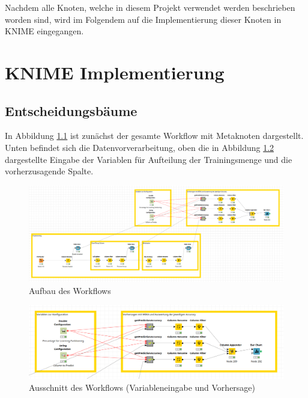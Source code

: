 \documentclass[12pt,					%
							 oneside,			%
							 a4paper,			%
							 halfparskip,		%
							 liststotoc,			%
							 bibtotoc,			%
							 fleqn,				%
							 pointlessnumbers]	%
							 {scrreprt}
\begin{document}
Nachdem alle Knoten, welche in diesem Projekt verwendet werden beschrieben worden sind, wird im Folgendem auf die Implementierung dieser Knoten in KNIME eingegangen.
\chapter{KNIME Implementierung}

	\section{Entscheidungsbäume}
		In Abbildung \ref{figure:trees:workflow} ist zunächst der gesamte Workflow mit Metaknoten dargestellt. Unten befindet sich die Datenvorverarbeitung, oben die in Abbildung \ref{figure:trees:workflow:zommed} dargestellte Eingabe der Variablen für Aufteilung der Trainingsmenge und die vorherzusagende Spalte.
				
		\begin{figure}[h]
			\begin{center}
				\includegraphics[scale=0.3]{pictures/trees-workflow-gesamt.png}
				\caption{Aufbau des Workflows}									
				\label{figure:trees:workflow}
			\end{center}
		\end{figure}
		
		\begin{figure}[h]
			\begin{center}
				\includegraphics[scale=0.3]{pictures/trees-workflow-gesamt-zoomed.png}
				\caption{Ausschnitt des Workflows (Variableneingabe und Vorhersage)}									
				\label{figure:trees:workflow:zommed}
			\end{center}
		\end{figure}
		
\end{document}
